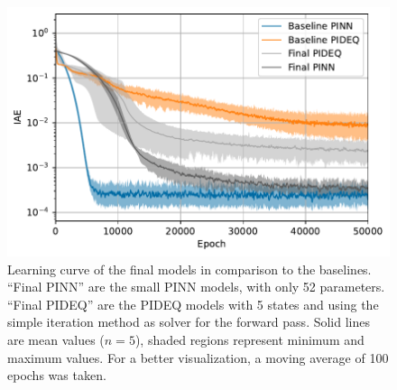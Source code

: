 \begin{figure}[h]
    \centering
    \includegraphics{images/final_iae.pdf}
    \caption[Learning curve of the final models in comparison to the baselines.]{Learning curve of the final models in comparison to the baselines. ``Final PINN'' are the small \gls{PINN} models, with only 52 parameters. ``Final PIDEQ'' are the \gls{PIDEQ} models with 5 states and using the simple iteration method as solver for the forward pass. Solid lines are mean values ($n=5$), shaded regions represent minimum and maximum values. For a better visualization, a moving average of 100 epochs was taken.}
    \label{fig:final-iae}
\end{figure}

